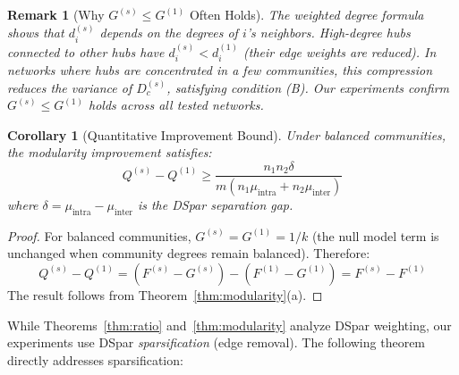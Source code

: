 \documentclass[10pt,journal,compsoc]{IEEEtran}
\newtheorem{corollary}{Corollary}
\newtheorem{remark}{Remark}
\begin{document}
\begin{remark}[Why $G^{(s)} \leq G^{(1)}$ Often Holds]
The weighted degree formula shows that $d_i^{(s)}$ depends on the degrees of $i$'s neighbors. High-degree hubs connected to other hubs have $d_i^{(s)} < d_i^{(1)}$ (their edge weights are reduced). In networks where hubs are concentrated in a few communities, this compression reduces the variance of $D_c^{(s)}$, satisfying condition (B). Our experiments confirm $G^{(s)} \leq G^{(1)}$ holds across all tested networks.
\end{remark}


\begin{corollary}[Quantitative Improvement Bound]
Under balanced communities, the modularity improvement satisfies:
\begin{equation}
Q^{(s)} - Q^{(1)} \geq \frac{n_1 n_2 \delta}{m(n_1 \mu_{\text{intra}} + n_2 \mu_{\text{inter}})}
\end{equation}
where $\delta = \mu_{\text{intra}} - \mu_{\text{inter}}$ is the DSpar separation gap.
\end{corollary}

\begin{proof}
For balanced communities, $G^{(s)} = G^{(1)} = 1/k$ (the null model term is unchanged when community degrees remain balanced). Therefore:
\begin{equation}
Q^{(s)} - Q^{(1)} = (F^{(s)} - G^{(s)}) - (F^{(1)} - G^{(1)}) = F^{(s)} - F^{(1)}
\end{equation}
The result follows from Theorem~\ref{thm:modularity}(a).
\end{proof}


While Theorems~\ref{thm:ratio} and~\ref{thm:modularity} analyze DSpar weighting, our experiments use DSpar \emph{sparsification} (edge removal). The following theorem directly addresses sparsification:
\end{document}
